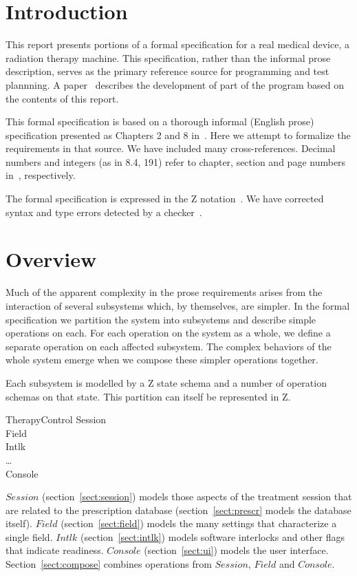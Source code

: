 \section{Introduction}

This report presents portions of a formal specification for a real
medical device, a radiation therapy machine. This specification,
rather than the informal prose description, serves as the primary
reference source for programming and test plannning.  A
paper~\cite{jacky95b} describes the development of part of the program
based on the contents of this report.

This formal specification is based on a thorough informal (English
prose) specification presented as Chapters 2 and 8 in~\cite{jacky92}.
Here we attempt to formalize the requirements in that
source.  We have included many cross-references.  Decimal numbers and
integers (as in 8.4, 191) refer to chapter, section and page numbers
in~\cite{jacky92}, respectively.

The formal specification is expressed in the Z
notation~\cite{spivey92}.  We have corrected syntax and type errors
detected by a checker~\cite{spivey92a}.

\section{Overview} 

Much of the apparent complexity in the prose requirements arises from
the interaction of several subsystems which, by themselves, are
simpler.  In the formal specification we partition the system
into subsystems and describe simple operations on each.  For each
operation on the system as a whole, we define a separate operation on
each affected subsystem.  The complex behaviors of the whole system
emerge when we compose these simpler operations together.  

Each subsystem is modelled by a Z state schema and a number of operation
schemas on that state. This partition can itself be represented in Z.

\begin{schema}{TherapyControl}
	Session \\
	Field \\
	Intlk \\
	\dots \\
	Console \\
\end{schema}
$Session$ (section~\ref{sect:session}) models those aspects of the
treatment session that are related to the prescription database
(section~\ref{sect:prescr} models the database itself).  $Field$
(section~\ref{sect:field}) models the many settings that characterize
a single field.  $Intlk$ (section~\ref{sect:intlk}) models software
interlocks and other flags that indicate readiness. $Console$
(section~\ref{sect:ui}) models the user interface.
Section~\ref{sect:compose} combines operations from $Session$, $Field$
and $Console$.

